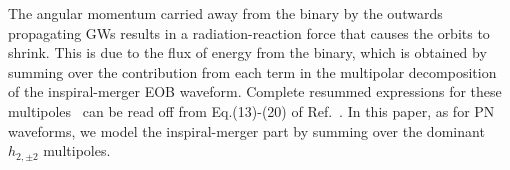 The angular momentum carried away from the binary
by the outwards propagating GWs results in a radiation-reaction force
that causes the orbits to shrink.
This is due to the flux of energy from the binary, which
is obtained by summing over the contribution from each term in the multipolar
decomposition of the inspiral-merger EOB waveform.
Complete resummed expressions for these multipoles~\cite{DamourFluxhlm01} can be 
read off from Eq.(13)-(20) of Ref.~\cite{BuonannoEOBv2Main}. In this paper, 
as for PN waveforms, we model the inspiral-merger part 
by summing over the dominant $h_{2,\pm 2}$ multipoles.


